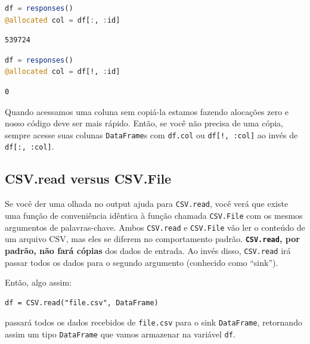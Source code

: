 \documentclass[
  notoc %
]{tufte-book}
\newcommand{\passthrough}[1]{#1}
\begin{document}
\begin{lstlisting}[language=Julia]
df = responses()
@allocated col = df[:, :id]
\end{lstlisting}

\begin{lstlisting}
539724
\end{lstlisting}

\begin{lstlisting}[language=Julia]
df = responses()
@allocated col = df[!, :id]
\end{lstlisting}

\begin{lstlisting}
0
\end{lstlisting}

Quando acessamos uma coluna sem copiá-la estamos fazendo alocações zero
e nosso código deve ser mais rápido. Então, se você não precisa de uma
cópia, sempre acesse suas colunas \passthrough{\lstinline!DataFrame!}s
com \passthrough{\lstinline!df.col!} ou
\passthrough{\lstinline"df[!, :col]"} ao invés de
\passthrough{\lstinline!df[:, :col]!}.

\hypertarget{sec:df_performance_csv_read_file}{%
\subsection{CSV.read versus
CSV.File}\label{sec:df_performance_csv_read_file}}

Se você der uma olhada no output ajuda para
\passthrough{\lstinline!CSV.read!}, você verá que existe uma função de
conveniência idêntica à função chamada
\passthrough{\lstinline!CSV.File!} com os mesmos argumentos de
palavras-chave. Ambos \passthrough{\lstinline!CSV.read!} e
\passthrough{\lstinline!CSV.File!} vão ler o conteúdo de um arquivo CSV,
mas eles se diferem no comportamento padrão.
\textbf{\passthrough{\lstinline!CSV.read!}, por padrão, não fará cópias}
dos dados de entrada. Ao invés disso, \passthrough{\lstinline!CSV.read!}
irá passar todos os dados para o segundo argumento (conhecido como
``sink'').

Então, algo assim:

\begin{lstlisting}
df = CSV.read("file.csv", DataFrame)
\end{lstlisting}

passará todos os dados recebidos de \passthrough{\lstinline!file.csv!}
para o sink \passthrough{\lstinline!DataFrame!}, retornando assim um
tipo \passthrough{\lstinline!DataFrame!} que vamos armazenar na variável
\passthrough{\lstinline!df!}.
\end{document}
